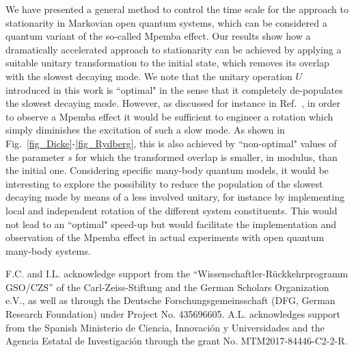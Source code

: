 \documentclass[prl,floatfix,twocolumn,superscriptaddress,showpacs,preprintnumbers,longbibliography,nofootinbib]{revtex4-1}
\begin{document}
 We have presented a general method to control the time scale for the approach to stationarity in Markovian open quantum systems, which can be considered a quantum variant of the so-called Mpemba effect. Our results show how a dramatically accelerated approach to stationarity can be achieved by applying a suitable unitary transformation to the initial state, which removes its overlap with the slowest decaying mode. We note that the unitary operation $U$ introduced in this work is ``optimal" in the sense that it completely de-populates the slowest decaying mode. However, as discussed for instance in Ref.~\cite{nava2019}, in order to observe a Mpemba effect it would be sufficient to engineer a rotation which simply diminishes the excitation of such a slow mode. As shown in Fig.~\ref{fig_Dicke}-\ref{fig_Rydberg}, this is also achieved by ``non-optimal" values of the parameter $s$ for which the transformed overlap is smaller, in modulus, than the initial one. Considering specific many-body quantum models, it would be interesting to explore the possibility to reduce the population of the slowest decaying mode by means of a less involved unitary, for instance by implementing local and independent rotation of the different system constituents. This would not lead to an ``optimal" speed-up but would facilitate the implementation and observation of the Mpemba effect in actual experiments with open quantum many-body systems.

\acknowledgments
{} F.C. and I.L. acknowledge support from the “Wissenschaftler-R\"uckkehrprogramm GSO/CZS” of the Carl-Zeiss-Stiftung and the German Scholars Organization e.V., as well as through the Deutsche Forschungsgemeinsschaft (DFG, German Research Foundation) under Project No. 435696605. A.L. acknowledges support from the Spanish Ministerio de Ciencia, Innovaci\'on y Universidades and the Agencia Estatal de Investigaci\'on  through the grant No. MTM2017-84446-C2-2-R.





\setcounter{equation}{0}
\setcounter{figure}{0}
\setcounter{table}{0}
\setcounter{page}{1}
\makeatletter
\renewcommand{\theequation}{S\arabic{equation}}
\renewcommand{\thefigure}{S\arabic{figure}}
\renewcommand{\bibnumfmt}[1]{[S#1]}
\renewcommand{\citenumfont}[1]{S#1}
\makeatletter
\renewcommand{\theequation}{S\arabic{equation}}
\renewcommand{\thefigure}{S\arabic{figure}}
\renewcommand{\bibnumfmt}[1]{[S#1]}
\renewcommand{\citenumfont}[1]{S#1}
\end{document}
